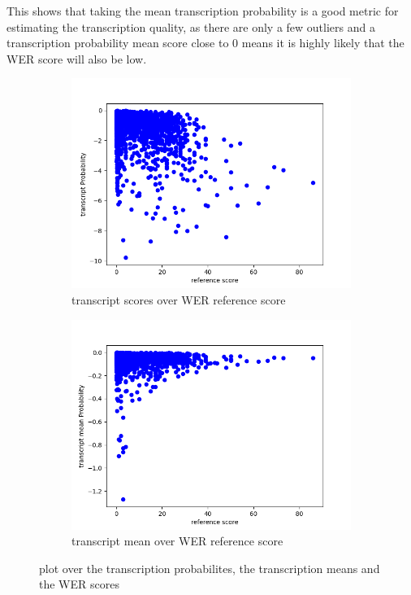 This shows that taking the mean transcription probability is a good metric for estimating the transcription quality, as there are only a few outliers and a transcription probability mean score close to 0 means it is highly likely that the WER score will also be low. 

\begin{figure}[ht]
    \centering%
    \begin{subfigure}{0.45\linewidth}
        \includegraphics[width=\textwidth]{Latex/sections/images/transcriptbasescore.png}
        \caption{transcript scores over WER reference score}
        \label{fig:transcript scatter plot base}
    \end{subfigure}
    \begin{subfigure}{0.45\linewidth}
        \includegraphics[width=\textwidth]{Latex/sections/images/transcriptmeanbasescore.png}
        \caption{transcript mean over WER reference score}
        \label{fig:transcript mean scatter plot}
    \end{subfigure}
    \caption{plot over the transcription probabilites, the transcription means and the WER scores}
    \label{fig:transcript scatter plot}
\end{figure}

